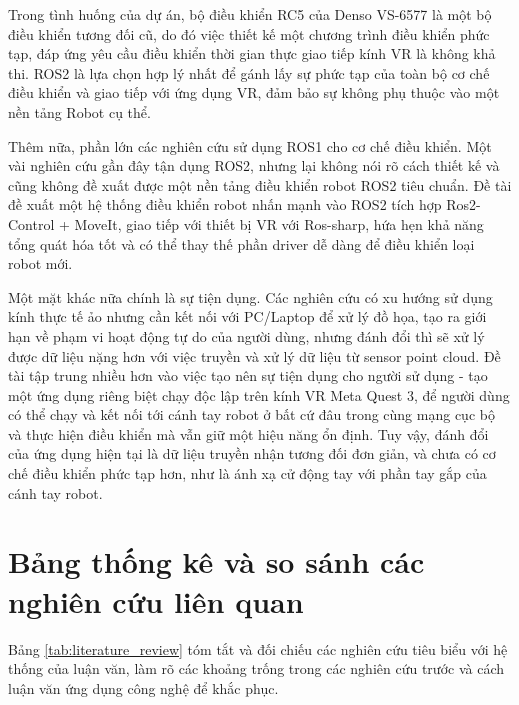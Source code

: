 Trong tình huống của dự án, bộ điều khiển RC5 của Denso VS-6577 là một bộ điều khiển tương đối cũ, do đó việc thiết kế một chương trình điều khiển phức tạp, đáp ứng yêu cầu điều khiển thời gian thực giao tiếp kính VR là không khả thi. ROS2 là lựa chọn hợp lý nhất để gánh lấy sự phức tạp của toàn bộ cơ chế điều khiển và giao tiếp với ứng dụng VR, đảm bảo sự không phụ thuộc vào một nền tảng Robot cụ thể. 

Thêm nữa, phần lớn các nghiên cứu sử dụng ROS1 cho cơ chế điều khiển. Một vài nghiên cứu gần đây tận dụng ROS2, nhưng lại không nói rõ cách thiết kế và cũng không đề xuất được một nền tảng điều khiển robot ROS2 tiêu chuẩn. Đề tài đề xuất một hệ thống điều khiển robot nhấn mạnh vào ROS2 tích hợp Ros2-Control + MoveIt, giao tiếp với thiết bị VR với Ros-sharp, hứa hẹn khả năng tổng quát hóa tốt và có thể thay thế phần driver dễ dàng để điều khiển loại robot mới.

Một mặt khác nữa chính là sự tiện dụng. Các nghiên cứu có xu hướng sử dụng kính thực tế ảo nhưng cần kết nối với PC/Laptop để xử lý đồ họa, tạo ra giới hạn về phạm vi hoạt động tự do của người dùng, nhưng đánh đổi thì sẽ xử lý được dữ liệu nặng hơn với việc truyền và xử lý dữ liệu từ sensor point cloud. Đề tài tập trung nhiều hơn vào việc tạo nên sự tiện dụng cho người sử dụng - tạo một ứng dụng riêng biệt chạy độc lập trên kính VR Meta Quest 3, để người dùng có thể chạy và kết nối tới cánh tay robot ở bất cứ đâu trong cùng mạng cục bộ và thực hiện điều khiển mà vẫn giữ một hiệu năng ổn định. Tuy vậy, đánh đổi của ứng dụng hiện tại là dữ liệu truyền nhận tương đối đơn giản, và chưa có cơ chế điều khiển phức tạp hơn, như là ánh xạ cử động tay với phần tay gắp của cánh tay robot.


\section{Bảng thống kê và so sánh các nghiên cứu liên quan}
Bảng \ref{tab:literature_review} tóm tắt và đối chiếu các nghiên cứu tiêu biểu với hệ thống của luận văn, làm rõ các khoảng trống trong các nghiên cứu trước và cách luận văn ứng dụng công nghệ để khắc phục.

